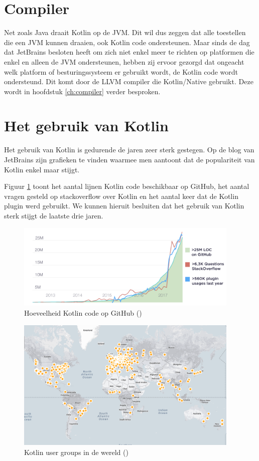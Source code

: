 \section{Compiler}
\label{sec:llvm}
Net zoals Java draait Kotlin op de JVM. Dit wil dus zeggen dat alle toestellen die een JVM kunnen draaien, ook Kotlin code ondersteunen. Maar sinds de dag dat JetBrains besloten heeft om zich niet enkel meer te richten op platformen die enkel en alleen de JVM ondersteunen, hebben zij ervoor gezorgd dat ongeacht welk platform of besturingssysteem er gebruikt wordt, de Kotlin code wordt ondersteund. Dit komt door de LLVM compiler die Kotlin/Native gebruikt. Deze wordt in hoofdstuk \ref{ch:compiler} verder besproken.

\section{Het gebruik van Kotlin}
\label{sec:kotlingebruik}
Het gebruik van Kotlin is gedurende de jaren zeer sterk gestegen. Op de blog van JetBrains zijn grafieken te vinden waarmee men aantoont dat de populariteit van Kotlin enkel maar stijgt.

Figuur \ref{fig:kotlingithub} toont het aantal lijnen Kotlin code beschikbaar op GitHub, het aantal vragen gesteld op stackoverflow over Kotlin en het aantal keer dat de Kotlin plugin werd gebruikt. We kunnen hieruit besluiten dat het gebruik van Kotlin sterk stijgt de laatste drie jaren.

\begin{figure} [ht]
	\centering
	\includegraphics[width=0.95\textwidth]{img/KotlinAdoption.png}
	\caption{Hoeveelheid Kotlin code op GitHub (\cite{JetBrains12})}
	\label{fig:kotlingithub}
\end{figure}

\begin{figure} [ht]
	\centering
	\includegraphics[width=0.95\textwidth]{img/KUGmap.png}
	\caption{Kotlin user groups in de wereld (\cite{JetBrains12})}
	\label{fig:usergroups}
\end{figure}

